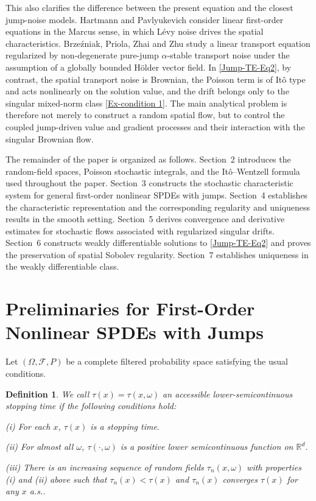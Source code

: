 \documentclass[12pt,oneside, reqno]{amsart}
\newtheorem{definition}[theorem]{Definition}
\def\mR{{\mathbb R}}
\def\sF{{\mathscr F}}
\numberwithin{equation}{section}
\begin{document}
	This also clarifies the difference between the present equation and the	closest jump-noise models. Hartmann and Pavlyukevich	\cite{HartmannPavlyukevich2023} consider linear first-order equations	in the Marcus sense, in which L\'evy noise drives the spatial	characteristics. Brze\'zniak, Priola, Zhai and Zhu	\cite{Brzezniak2025} study a linear transport equation regularized by	non-degenerate pure-jump \(\alpha\)-stable transport noise under the
	assumption of a globally bounded H\"older vector field. In	\eqref{Jump-TE-Eq2}, by contrast, the spatial transport noise is	Brownian, the Poisson term is of It\^o type and acts nonlinearly on the	solution value, and the drift belongs only to the singular mixed-norm	class \eqref{Ex-condition 1}. The main analytical problem is therefore	not merely to construct a random spatial flow, but to control the	coupled jump-driven value and gradient processes and their interaction
	with the singular Brownian flow.
	
	The remainder of the paper is organized as follows. Section~2	introduces the random-field spaces, Poisson stochastic integrals, and	the It\^o--Wentzell formula used throughout the paper. Section~3	constructs the stochastic characteristic system for general	first-order nonlinear SPDEs with jumps. Section~4 establishes the	characteristic representation and the corresponding regularity and	uniqueness results in the smooth setting. Section~5 derives convergence
	and derivative estimates for stochastic flows associated with	regularized singular drifts. Section~6 constructs weakly differentiable	solutions to \eqref{Jump-TE-Eq2} and proves the preservation of spatial
	Sobolev regularity. Section~7 establishes uniqueness in the weakly	differentiable class.

	
	
	
	
\section{Preliminaries for First-Order Nonlinear SPDEs with Jumps}
Let $(\Omega,\sF,P)$ be a complete filtered probability space satisfying the usual conditions.

\begin{definition}
We call $\tau(x)=\tau(x,\omega)$ an accessible lower-semicontinuous stopping time if the following conditions hold:

(i) For each $x$, $\tau(x)$ is a stopping time.

(ii) For almost all $\omega$, $\tau(\cdot,\omega)$ is a positive lower semicontinuous function on $\mR^d$.

(iii) There is an increasing sequence of random fields $\tau_n(x,\omega)$ with  properties (i) and (ii) above such that $\tau_n(x)<\tau(x)$ and $\tau_n(x)$ converges $\tau(x)$ for any $x$ a.s..
\end{definition}
\end{document}
